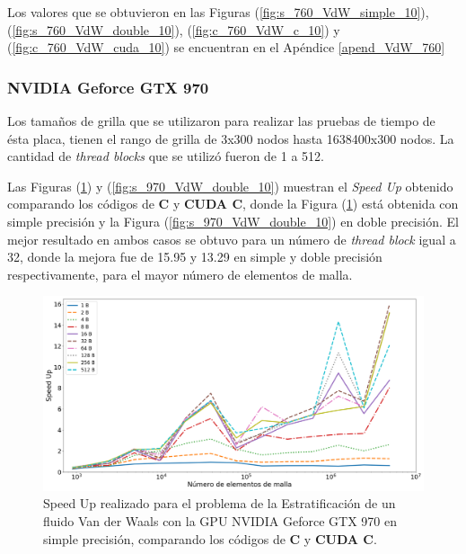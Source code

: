 Los valores que se obtuvieron en las Figuras (\ref{fig:s_760_VdW_simple_10}), (\ref{fig:s_760_VdW_double_10}), (\ref{fig:c_760_VdW_c_10}) y (\ref{fig:c_760_VdW_cuda_10}) se encuentran en el Apéndice \ref{apend_VdW_760}

\newpage

\subsubsection{NVIDIA Geforce GTX 970}

Los tamaños de grilla que se utilizaron para realizar las pruebas de tiempo de ésta placa, tienen el rango de grilla de 3x300 nodos hasta 1638400x300 nodos. La cantidad de \textit{thread blocks} que se utilizó fueron de 1 a 512.

Las Figuras (\ref{fig:s_970_VdW_simple_10}) y (\ref{fig:s_970_VdW_double_10}) muestran el \textit{Speed Up} obtenido comparando los códigos de \textbf{C} y \textbf{CUDA C}, donde la Figura (\ref{fig:s_970_VdW_simple_10}) está obtenida con simple precisión y la Figura (\ref{fig:s_970_VdW_double_10}) en doble precisión. El mejor resultado en ambos casos se obtuvo para un número de \textit{thread block} igual a 32, donde la mejora fue de 15.95 y 13.29 en simple y doble precisión respectivamente, para el mayor número de elementos de malla.


\begin{figure}[h!]
	\centering
	\includegraphics[width=\textwidth]{figs/cap4/s_970_VdW_simple_10}
	\caption{Speed Up realizado para el problema de la Estratificación de un fluido Van der Waals con la GPU NVIDIA Geforce GTX 970 en simple precisión, comparando los códigos de \textbf{C} y \textbf{CUDA C}.} 
	\label{fig:s_970_VdW_simple_10}	
\end{figure}

